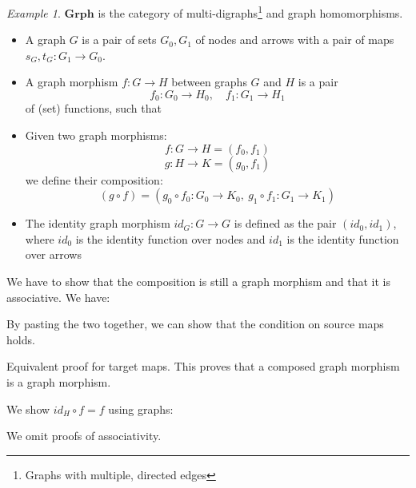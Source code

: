 \documentclass[fleqn]{scrartcl}
\newenvironment{category}{\begin{itemize}[leftmargin=.9in]}{\end{itemize}}
\newcommand{\catobj}[1]{\item[\textbf{Object}] #1}
\newcommand{\catarr}[1]{\item[\textbf{Arrows}] #1}
\newcommand{\catcomp}[1]{\item[\textbf{Comp.}] #1}
\newcommand{\catid}[1]{\item[\textbf{Ident.}] #1}
\newcommand{\ccat}[1]{\mathbf{#1}}
\theoremstyle{definition} \newtheorem{definition}{Definition}
\theoremstyle{remark} \newtheorem{example}{Example}
\begin{document}
\begin{example}
  $\ccat{Grph}$ is the category of multi-digraphs\footnote{Graphs with
    multiple, directed edges} and graph homomorphisms.

  \begin{category}
    \catobj{A graph $G$ is a pair of sets $G_0, G_1$ of nodes and arrows with a
      pair of maps $s_G, t_G : G_1 \to G_0$.}
    \catarr{A graph morphism $f : G \to H$ between graphs $G$ and $H$ is a
      pair
      \[ f_0 : G_0 \to H_0, \quad f_1 : G_1 \to H_1 \]
    of (set) functions, such that}


    \catcomp{Given two graph morphisms:
      \[ f : G \to H = (f_0, f_1) \]
      \[ g : H \to K = (g_0, f_1) \]
      we define their composition:
      \[ (g \circ f) = (g_0 \circ f_0 : G_0 \to K_0,\ g_1 \circ f_1 : G_1
      \to K_1) \]
    }
    \catid{The identity graph morphism $id_G : G \to G$ is defined as
      the pair $(id_0, id_1)$, where $id_0$ is the identity function
      over nodes and $id_1$ is the identity function over arrows}
  \end{category}

  We have to show that the composition is still a graph morphism and
  that it is associative. We have:


  By pasting the two together, we can show that the condition on source
  maps holds.


  Equivalent proof for target maps. This proves that a composed graph
  morphism is a graph morphism.

  We show $id_H \circ f = f$ using graphs:


  We omit proofs of associativity.
\end{example}
\end{document}
